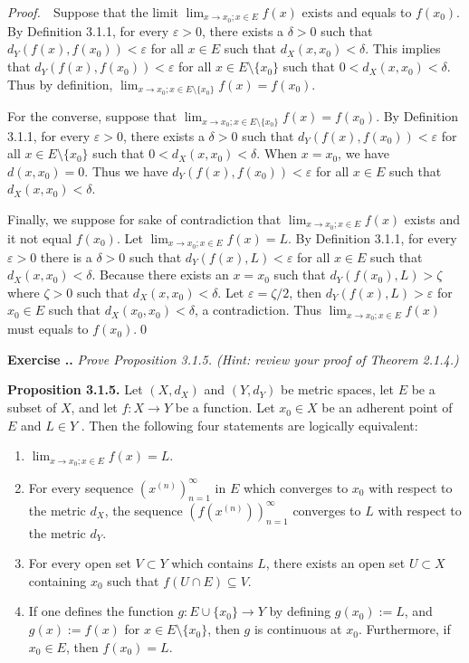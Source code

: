 \documentclass{book}
\newcommand{\pff}{\vspace{.25em}\noindent\emph{Proof.}~~}
\newcommand{\titl}[1]{\noindent\textbf{#1}}
\newcounter{Exercise}[section]
\renewcommand{\theExercise}{\thesection.\arabic{Exercise}.}
\newcommand{\new}{\vspace{1.5em}\noindent\textbf{Exercise \stepcounter{Exercise}\textbf{\theExercise}} }
\begin{document}
\pff Suppose that the limit $\lim_{x\to x_0;x\in E}f(x)$ exists and equals to $f(x_0)$. By Definition 3.1.1, for every $\varepsilon>0$, there exists a $\delta>0$ such that $d_Y(f(x),f(x_0))<\varepsilon$ for all $x\in E$ such that $d_X(x,x_0)<\delta$. This implies that $d_Y(f(x),f(x_0))<\varepsilon$ for all $x\in E\setminus\{x_0\}$ such that $0<d_X(x,x_0)<\delta$. Thus by definition, $\lim_{x\to x_0;x\in E\setminus\{x_0\}}f(x)=f(x_0)$.

For the converse, suppose that $\lim_{x\to x_0;x\in E\setminus\{x_0\}}f(x)=f(x_0)$. By Definition 3.1.1, for every $\varepsilon>0$, there exists a $\delta>0$ such that $d_Y(f(x),f(x_0))<\varepsilon$ for all $x\in E\setminus\{x_0\}$ such that $0<d_X(x,x_0)<\delta$. When $x=x_0$, we have $d(x,x_0)=0$. Thus we have $d_Y(f(x),f(x_0))<\varepsilon$ for all $x\in E$ such that $d_X(x,x_0)<\delta$.

Finally, we suppose for sake of contradiction that $\lim_{x\to x_0;x\in E}f(x)$ exists and it not equal $f(x_0)$. Let $\lim_{x\to x_0;x\in E}f(x)=L$. By Definition 3.1.1, for every $\varepsilon>0$ there is a $\delta>0$ such that $d_Y(f(x),L)<\varepsilon$ for all $x\in E$ such that $d_X(x,x_0)<\delta$. Because there exists an $x=x_0$ such that $d_Y(f(x_0),L)>\zeta$ where $\zeta>0$ such that $d_X(x,x_0)<\delta$. Let $\varepsilon=\zeta/2$, then $d_Y(f(x),L)>\varepsilon$ for $x_0\in E$ such that $d_X(x_0,x_0)<\delta$, a contradiction. Thus $\lim_{x\to x_0;x\in E}f(x)$ must equals to $f(x_0)$.\qed

\new\emph{Prove Proposition 3.1.5. (Hint: review your proof of Theorem 2.1.4.)}

\begin{framed}
\titl{Proposition 3.1.5.} Let $(X,d_X)$ and $(Y,d_Y)$ be metric spaces, let $E$ be a subset of $X$, and let $f:X\to Y$ be a function. Let $x_0\in X$ be an adherent point of $E$ and $L\in Y$ . Then the following four statements are logically equivalent:
\begin{enumerate}
    \item $\lim_{x\to x_0;x\in E}f(x)=L$.
    \item For every sequence $(x^{(n)})_{n=1}^{\infty}$ in $E$ which converges to $x_0$ with respect to the metric $d_X$, the sequence $(f(x^{(n)}))_{n=1}^{\infty}$ converges to $L$ with respect to the metric $d_Y$.
    \item For every open set $V\subset Y$ which contains $L$, there exists an open set $U\subset X$ containing $x_0$ such that $f(U\cap E)\subseteq V$.
    \item If one defines the function $g:E\cup\{x_0\}\to Y$ by defining $g(x_0):=L$, and $g(x):=f(x)$ for $x\in E\setminus\{x_0\}$, then $g$ is continuous at $x_0$. Furthermore, if $x_0\in E$, then $f(x_0)=L$.
\end{enumerate}
\end{framed}
\end{document}
